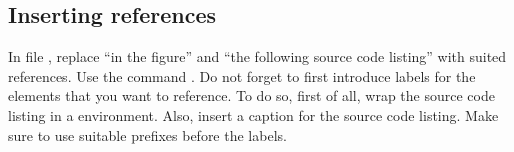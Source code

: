 \subsection{Inserting references}

In file , replace \enquote{in the 
figure} and \enquote{the following source code listing} with suited references. 
Use the command . Do not forget to first 
introduce labels for the elements that you want to reference. To do so, first 
of all, wrap the source code listing in a  environment.
Also, insert a caption for the source code listing. 
Make sure to use suitable prefixes before the labels.
